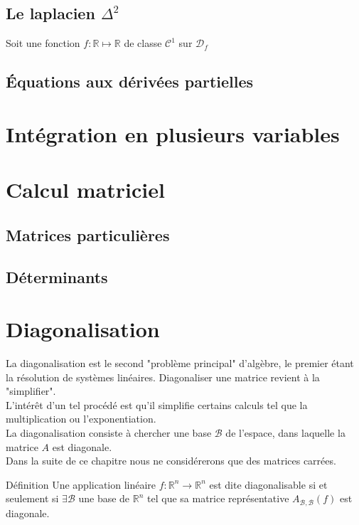 \section{Le laplacien $\Delta^2$}
\begin{defi}
Soit une fonction $f:\mathbb{R}\mapsto\mathbb{R}$ de classe $\mathscr{C}^1$ sur $\mathscr{D}_f$
\end{defi}
\section{Équations aux dérivées partielles}
\chapter{Intégration en plusieurs variables}
\chapter{Calcul matriciel}
\section{Matrices particulières}
\section{Déterminants}
\chapter{Diagonalisation}
  La diagonalisation est le second "problème principal" d'algèbre, le premier étant la résolution de systèmes
  linéaires.
Diagonaliser une matrice revient à la "simplifier".\\
L'intérêt d'un tel procédé est qu'il simplifie certains calculs tel que la multiplication ou l'exponentiation.\\
La diagonalisation consiste à chercher une base $\mathscr{B}$ de l'espace, dans laquelle la matrice $A$ est diagonale.\\
Dans la suite de ce chapitre nous ne considérerons que des matrices carrées.\\
\begin{bclogo}[couleur=blue!30,couleurBord=blue,arrondi=0.1,logo=\bcbook,ombre=true]{Définition}
Une application linéaire $f:\mathbb{R}^{n}\rightarrow\mathbb{R}^{n}$  est dite diagonalisable si et seulement si $\exists \mathscr{B}$ une base de $\mathbb{R}^{n}$ tel que sa matrice représentative $A_{\mathscr{B},\mathscr{B}}(f)$ est diagonale.
\end{bclogo}
